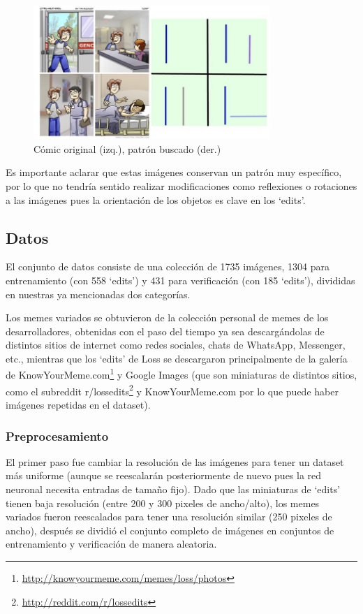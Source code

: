 \documentclass[spanish,11pt,letterpaper]{article}
\begin{document}
\begin{figure}[h]
\centering
\includegraphics[width=0.8\textwidth]{lossminimal}
\caption{Cómic original (izq.), patrón buscado (der.)}
\label{fig:loss}
\end{figure}

Es importante aclarar que estas imágenes conservan un patrón muy específico, por
lo que no tendría sentido realizar modificaciones como reflexiones o rotaciones
a las imágenes pues la orientación de los objetos es clave en los `edits'.

\subsection{Datos}

El conjunto de datos consiste de una colección de 1735 imágenes, 1304 para
entrenamiento (con 558 `edits') y 431 para verificación (con 185 `edits'), divididas
en nuestras ya mencionadas dos categorías.

Los memes variados se obtuvieron de la colección personal de memes de los
desarrolladores, obtenidas con el paso del tiempo ya sea descargándolas de
distintos sitios de internet como redes sociales, chats de WhatsApp, Messenger,
etc., mientras que los `edits' de Loss se descargaron principalmente de la galería
de \textsf{KnowYourMeme.com}\footnote{\url{http://knowyourmeme.com/memes/loss/photos}} y
\textsf{Google Images} (que son miniaturas de distintos sitios, como el subreddit
\textsf{r/lossedits}\footnote{\url{http://reddit.com/r/lossedits}} y
\textsf{KnowYourMeme.com} por lo que puede haber imágenes repetidas en el dataset).

\subsubsection{Preprocesamiento}

El primer paso fue cambiar la resolución de las imágenes para tener un dataset
más uniforme (aunque se reescalarán posteriormente de nuevo pues la red neuronal
necesita entradas de tamaño fijo). Dado que las miniaturas de `edits' tienen baja
resolución (entre 200 y 300 pixeles de ancho/alto), los memes variados fueron
reescalados para tener una resolución similar (250 pixeles de ancho), después se
dividió el conjunto completo de imágenes en conjuntos de entrenamiento y
verificación de manera aleatoria.
\end{document}
